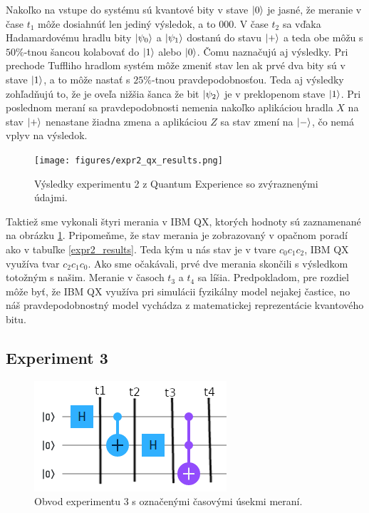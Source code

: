 Nakoľko na vstupe do systému sú kvantové bity v stave \(\ket{0}\) je jasné, že
meranie v čase \(t_1\) môže dosiahnúť len jediný výsledok, a to  \(000\).
V čase \(t_2\) sa vďaka Hadamardovému hradlu bity \(\ket{\psi_0}\) a 
\(\ket{\psi_1}\) dostanú do stavu \(\ket{+}\) a teda obe môžu s \(50\%\)-tnou
šancou kolabovať do \(\ket{1}\) alebo \(\ket{0}\). Čomu naznačujú aj výsledky.
Pri prechode Tuffliho hradlom systém môže zmeniť stav len ak prvé dva bity sú 
v stave \(\ket{1}\), a to môže nastať s \(25\%\)-tnou pravdepodobnosťou. Teda
aj výsledky zohľadňujú to, že je oveľa nižšia šanca že bit \(\ket{\psi_2}\)
je v preklopenom stave \(\ket{1}\). Pri poslednom meraní sa pravdepodobnosti
nemenia nakoľko aplikáciou hradla \(X\) na stav \(\ket{+}\) nenastane žiadna
zmena a aplikáciou \(Z\) sa stav zmení na \(\ket{-}\), čo nemá vplyv na
výsledok.

\begin{figure} 
	\centering 
	\texttt{[image: figures/expr2\_qx\_results.png]} 
	\caption{Výsledky experimentu 2 z Quantum Experience so zvýraznenými 
údajmi.}

    \label{expr2_qx_results}
\end{figure}

Taktiež sme vykonali štyri merania v IBM QX, ktorých hodnoty sú zaznamenané
na obrázku \ref{expr2_qx_results}. Pripomeňme, že stav merania je zobrazovaný
v opačnom poradí ako v tabuľke \ref{expr2_results}. Teda kým u nás stav je 
v tvare \(c_0c_1c_2\), IBM QX využíva tvar \(c_2c_1c_0\). Ako sme očakávali, 
prvé dve merania skončili s výsledkom totožným s našim. Meranie v časoch 
\(t_3\) a \(t_4\) sa líšia. Predpokladom, pre rozdiel môže byť, že IBM QX 
využíva pri simulácii fyzikálny model nejakej častice, no náš pravdepodobnostný
model vychádza z matematickej reprezentácie kvantového bitu.

\subsection{Experiment 3}

\begin{figure} 
	\centering 
	\includegraphics[width=.6\textwidth]{figures/expr3_circuit.png} 
	\caption{Obvod experimentu 3 s označenými časovými úsekmi meraní.}
    \label{expr3_circuit}
\end{figure}

